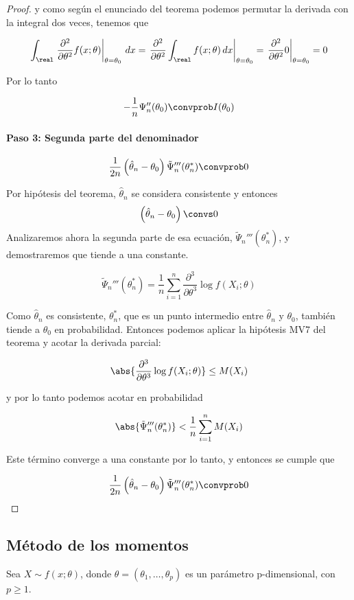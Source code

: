 \documentclass{apuntes}
\begin{document}
\begin{proof}
y como según el enunciado del teorema podemos permutar la derivada con la integral dos veces, tenemos que

\[ \int_\real \left.\frac{\partial^2}{\partial\theta^2}f(x;\theta)\right|_{\theta=\theta_0}\,dx =  \left.\frac{\partial^2}{\partial\theta^2}\int_\real f(x;\theta)\,dx\right|_{\theta=\theta_0} = \left.\frac{\partial^2}{\partial\theta^2}0\right|_{\theta=\theta_0}  = 0 \]

Por lo tanto

\[ - \frac{1}{n}\Psi_n''(\theta_0) \convprob I(\theta_0) \]

\paragraph{Paso 3: Segunda parte del denominador}

\[\frac{1}{2n}\left(\hat\theta_n-\theta_0\right)\tilde\Psi_n'''(\theta_n^\ast) \convprob 0 \]

Por hipótesis del teorema, $\hat\theta_n$ se considera consistente y entonces \[ \left(\hat\theta_n-\theta_0\right) \convs 0 \] Analizaremos ahora la segunda parte de esa ecuación, $\tilde\Psi_n'''(\theta_n^\ast)$, y demostraremos que tiende a una constante.

\[ \tilde\Psi_n'''(\theta_n^\ast) = \frac{1}{n}\sum_{i=1}^n \frac{\partial^3}{\partial\theta^3}\log f(X_i;\theta) \]

Como $\hat\theta_n$ es consistente, $\theta_n^\ast$, que es un punto intermedio entre $\hat\theta_n$ y $\theta_0$, también tiende a $\theta_0$ en probabilidad. Entonces podemos aplicar la hipótesis MV7 del teorema y acotar la derivada parcial:

\[ \abs{\frac{\partial^3}{\partial\theta^3}\log f(X_i;\theta)} \leq M(X_i) \]

y por lo tanto podemos acotar en probabilidad

\[ \abs{\tilde\Psi_n'''(\theta_n^\ast)} < \frac{1}{n}\sum_{i=1}^n M(X_i) \]

Este término converge a una constante por lo tanto, y entonces se cumple que

\[\frac{1}{2n}\left(\hat\theta_n-\theta_0\right)\tilde\Psi_n'''(\theta_n^\ast) \convprob 0 \]
\end{proof}

\pagebreak
\subsection{Método de los momentos}
Sea $X\sim f(x;\theta)$, donde $\theta = (\theta_1,\dotsc,\theta_p)$ es un parámetro p-dimensional, con $p\geq1$.
\end{document}
